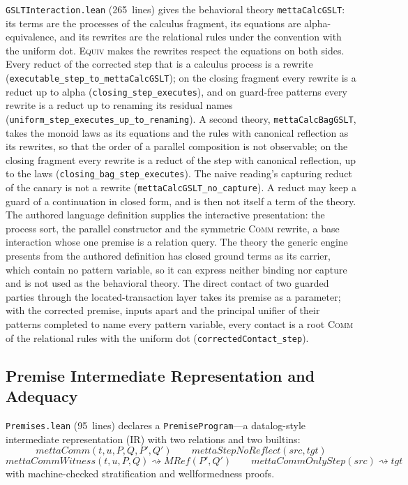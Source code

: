 \documentclass[11pt]{article}
\theoremstyle{definition}
\theoremstyle{remark}
\begin{document}
\texttt{GSLTInteraction.lean} (265~lines) gives the behavioral theory
\texttt{mettaCalcGSLT}: its terms are the processes of the calculus
fragment, its equations are alpha-equivalence, and its rewrites are the
relational rules under the convention with the uniform dot.
\textsc{Equiv} makes the rewrites
respect the equations on both sides.  Every reduct of the corrected step
that is a calculus process is a rewrite
(\texttt{executable\_step\_to\_mettaCalcGSLT}); on the closing fragment
every rewrite is a reduct up to alpha (\texttt{closing\_step\_executes}),
and on guard-free patterns every rewrite is a reduct up to renaming its
residual names (\texttt{uniform\_step\_executes\_up\_to\_renaming}).
A second theory, \texttt{mettaCalcBagGSLT}, takes the monoid laws as its
equations and the rules with canonical reflection as its rewrites, so that
the order of a parallel composition is not observable; on the closing
fragment every rewrite is a reduct of the step with canonical reflection,
up to the laws (\texttt{closing\_bag\_step\_executes}).
The naive reading's capturing reduct of the canary is not a rewrite
(\texttt{mettaCalcGSLT\_no\_capture}).
A reduct may keep a guard of a continuation in closed form, and is then
not itself a term of the theory.  The authored language definition
supplies the interactive presentation: the process sort, the parallel
constructor and the symmetric \textsc{Comm} rewrite, a base interaction
whose one premise is a relation query.  The theory the generic engine
presents from the authored definition has closed ground terms as its
carrier, which contain no pattern variable, so it can express neither
binding nor capture and is not used as the behavioral theory.  The direct
contact of two guarded parties through the located-transaction layer
takes its premise as a parameter; with the corrected premise, inputs apart
and the principal unifier of their patterns completed to name every pattern
variable, every contact is a root \textsc{Comm} of the relational rules with
the uniform dot (\texttt{correctedContact\_step}).

\subsection{Premise Intermediate Representation and Adequacy}
\label{sec:metta-premises}

\texttt{Premises.lean} (95~lines) declares a \texttt{PremiseProgram}---a
datalog-style intermediate representation (IR) with two relations and
two builtins:
\[
  \mathit{mettaComm}(t, u, P, Q, P', Q') \qquad
  \mathit{mettaStepNoReflect}(\mathit{src}, \mathit{tgt})
\]
\[
  \mathit{mettaCommWitness}(t, u, P, Q) \rightsquigarrow \mathit{MRef}(P', Q')
  \qquad
  \mathit{mettaCommOnlyStep}(\mathit{src}) \rightsquigarrow \mathit{tgt}
\]
with machine-checked stratification and wellformedness proofs.
\end{document}
